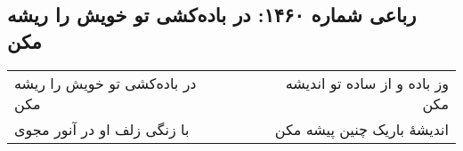 \begin{center}
\section*{رباعی شماره ۱۴۶۰: در باده‌کشی تو خویش را ریشه مکن}
\label{sec:1460}
\begin{longtable}{l p{0.5cm} r}
در باده‌کشی تو خویش را ریشه مکن
&&
وز باده و از ساده تو اندیشه مکن
\\
با زنگی زلف او در آنور مجوی
&&
اندیشهٔ باریک چنین پیشه مکن
\\
\end{longtable}
\end{center}
